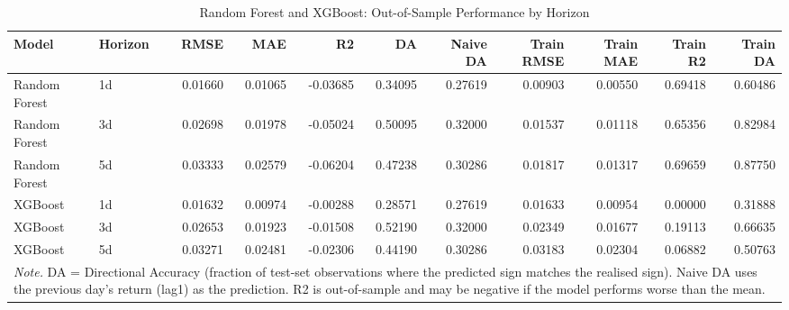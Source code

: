 \begin{table}[!ht]
\centering
\caption{\label{tab:rf_xgboost_metrics}Random Forest and XGBoost: Out-of-Sample Performance by Horizon}
\footnotesize
\setlength{\tabcolsep}{3.5pt}

\begin{tabular}{llrrrrrrrrr}
\toprule
Model & Horizon & RMSE & MAE & R2 & DA & Naive DA & Train RMSE & Train MAE & Train R2 & Train DA\\
\midrule
Random Forest & 1d & 0.01660 & 0.01065 & -0.03685 & 0.34095 & 0.27619 & 0.00903 & 0.00550 & 0.69418 & 0.60486\\
Random Forest & 3d & 0.02698 & 0.01978 & -0.05024 & 0.50095 & 0.32000 & 0.01537 & 0.01118 & 0.65356 & 0.82984\\
Random Forest & 5d & 0.03333 & 0.02579 & -0.06204 & 0.47238 & 0.30286 & 0.01817 & 0.01317 & 0.69659 & 0.87750\\
XGBoost & 1d & 0.01632 & 0.00974 & -0.00288 & 0.28571 & 0.27619 & 0.01633 & 0.00954 & 0.00000 & 0.31888\\
XGBoost & 3d & 0.02653 & 0.01923 & -0.01508 & 0.52190 & 0.32000 & 0.02349 & 0.01677 & 0.19113 & 0.66635\\
XGBoost & 5d & 0.03271 & 0.02481 & -0.02306 & 0.44190 & 0.30286 & 0.03183 & 0.02304 & 0.06882 & 0.50763\\
\bottomrule
\multicolumn{11}{p{\linewidth}}{\rule{0pt}{1em}\textit{Note.} DA = Directional Accuracy (fraction of test-set observations where the predicted sign matches the realised sign). Naive DA uses the previous day's return (lag1) as the prediction. R2 is out-of-sample and may be negative if the model performs worse than the mean.}\\
\end{tabular}
\end{table}
